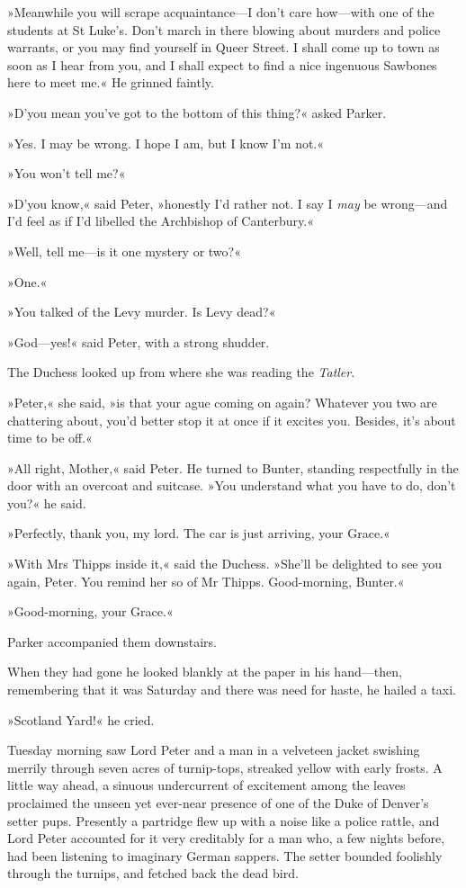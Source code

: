 »Meanwhile you will scrape acquaintance\allowbreak---\allowbreak I don't care how\allowbreak---\allowbreak with one of the students at St Luke's. Don't march in there blowing about murders and police warrants, or you may find yourself in Queer Street. I shall come up to town as soon as I hear from you, and I shall expect to find a nice ingenuous Sawbones here to meet me.« He grinned faintly.

»D'you mean you've got to the bottom of this thing?« asked Parker.

»Yes. I may be wrong. I hope I am, but I know I'm not.«

»You won't tell me?«

»D'you know,« said Peter, »honestly I'd rather not. I say I \textit{may} be wrong\allowbreak---\allowbreak and I'd feel as if I'd libelled the Archbishop of Canterbury.«

»Well, tell me\allowbreak---\allowbreak is it one mystery or two?«

»One.«

»You talked of the Levy murder. Is Levy dead?«

»God\allowbreak---\allowbreak yes!« said Peter, with a strong shudder.

The Duchess looked up from where she was reading the \textit{Tatler}.

»Peter,« she said, »is that your ague coming on again? Whatever you two are chattering about, you'd better stop it at once if it excites you. Besides, it's about time to be off.«

»All right, Mother,« said Peter. He turned to Bunter, standing respectfully in the door with an overcoat and suitcase. »You understand what you have to do, don't you?« he said.

»Perfectly, thank you, my lord. The car is just arriving, your Grace.«

»With Mrs Thipps inside it,« said the Duchess. »She'll be delighted to see you again, Peter. You remind her so of Mr Thipps. Good-morning, Bunter.«

»Good-morning, your Grace.«

Parker accompanied them downstairs.

When they had gone he looked blankly at the paper in his hand\allowbreak---\allowbreak then, remembering that it was Saturday and there was need for haste, he hailed a taxi.

»Scotland Yard!« he cried.

Tuesday morning saw Lord Peter and a man in a velveteen jacket swishing merrily through seven acres of turnip-tops, streaked yellow with early frosts. A little way ahead, a sinuous undercurrent of excitement among the leaves proclaimed the unseen yet ever-near presence of one of the Duke of Denver's setter pups. Presently a partridge flew up with a noise like a police rattle, and Lord Peter accounted for it very creditably for a man who, a few nights before, had been listening to imaginary German sappers. The setter bounded foolishly through the turnips, and fetched back the dead bird.

